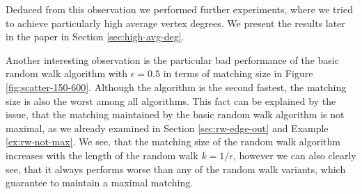 \documentclass{article}      %
\begin{document}
Deduced from this observation we performed further experiments, where we tried to achieve particularly high average vertex degrees. We present the results later in the paper in Section \ref{sec:high-avg-deg}.

\bigskip \noindent
Another interesting observation is the particular bad performance of the basic random walk algorithm with $\epsilon=0.5$ in terms of matching size in Figure \ref{fig:scatter-150-600}. Although the algorithm is the second fastest, the matching size is also the worst among all algorithms. This fact can be explained by the issue, that the matching maintained by the basic random walk algorithm is not maximal, as we already examined in Section \ref{sec:rw-edge-out} and Example \ref{ex:rw-not-max}. We see, that the matching size of the random walk algorithm increases with the length of the random walk $k=1/\epsilon$, however we can also clearly see, that it always performs worse than any of the random walk variants, which guarantee to maintain a maximal matching.
\end{document}
